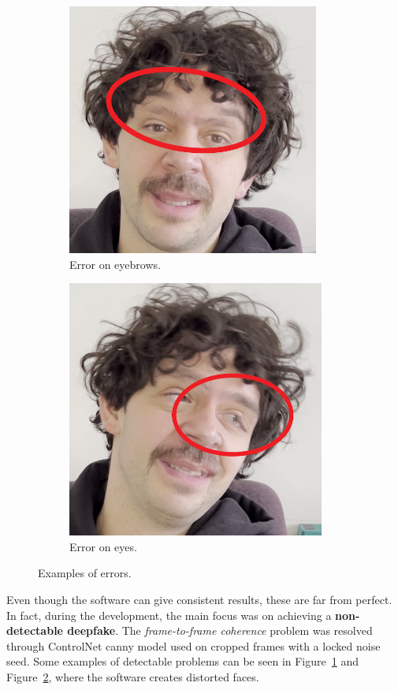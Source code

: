 \documentclass[sn-mathphys,Numbered]{sn-jnl}
\theoremstyle{thmstyleone}%
\theoremstyle{thmstyletwo}%
\theoremstyle{thmstylethree}%
\begin{document}
\begin{figure}[b]
	\centering
	\begin{subfigure}[b]{0.5\textwidth}
		\centering
		\includegraphics[scale=0.34]{img/project_img/error-eyebrows.png}
		\caption{Error on eyebrows.}\label{fig:error-eyebrows}
	\end{subfigure}%
	\hfill
	\begin{subfigure}[b]{0.5\textwidth}
		\centering
		\includegraphics[scale=0.34]{img/project_img/error-eyes.png}
		\caption{Error on eyes.}\label{fig:error-eyes}
	\end{subfigure}
	\caption{Examples of errors.}\label{fig:errors}
\end{figure}

Even though the software can give consistent results, these are far from perfect. In fact, during the development, the main focus was on achieving a \textbf{non-detectable deepfake}. The \emph{frame-to-frame coherence} problem was resolved through ControlNet  canny model used on cropped frames with a locked noise seed.  Some examples of detectable problems can be seen in Figure~\ref{fig:error-eyebrows} and Figure~\ref{fig:error-eyes},  where the software creates distorted faces. 
\end{document}
